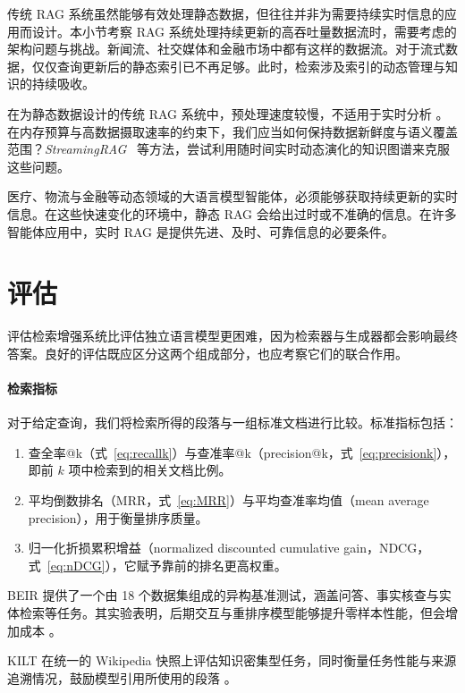 传统 RAG 系统虽然能够有效处理静态数据，但往往并非为需要持续实时信息的应用而设计。本小节考察 RAG 系统处理持续更新的高吞吐量数据流时，需要考虑的架构问题与挑战。新闻流、社交媒体和金融市场中都有这样的数据流。对于流式数据，仅仅查询更新后的静态索引已不再足够。此时，检索涉及索引的动态管理与知识的持续吸收。

在为静态数据设计的传统 RAG 系统中，预处理速度较慢，不适用于实时分析 \citep{zhu2025staticdynamicstreamingrag,sankaradas2025streamingragrealtimecontextualretrieval}。
在内存预算与高数据摄取速率的约束下，我们应当如何保持数据新鲜度与语义覆盖范围？\emph{StreamingRAG}~\citep{sankaradas2025streamingragrealtimecontextualretrieval} 等方法，尝试利用随时间实时动态演化的知识图谱来克服这些问题。

医疗、物流与金融等动态领域的大语言模型智能体，必须能够获取持续更新的实时信息。在这些快速变化的环境中，静态 RAG 会给出过时或不准确的信息。在许多智能体应用中，实时 RAG 是提供先进、及时、可靠信息的必要条件。


\section{评估}\label{sec:r_evaluation}
评估检索增强系统比评估独立语言模型更困难，因为检索器与生成器都会影响最终答案。良好的评估既应区分这两个组成部分，也应考察它们的联合作用。

\paragraph{检索指标} 对于给定查询，我们将检索所得的段落与一组标准文档进行比较。标准指标包括：
\begin{enumerate}
    \item 查全率@k（式~\ref{eq:recallk}）与查准率@k（precision@k，式~\ref{eq:precisionk}），即前 $k$ 项中检索到的相关文档比例。
    \item 平均倒数排名（MRR，式~\ref{eq:MRR}）与平均查准率均值（mean average precision），用于衡量排序质量。
    \item 归一化折损累积增益（normalized discounted cumulative gain，NDCG，式~\ref{eq:nDCG}），它赋予靠前的排名更高权重。
\end{enumerate}
BEIR 提供了一个由 18 个数据集组成的异构基准测试，涵盖问答、事实核查与实体检索等任务。其实验表明，后期交互与重排序模型能够提升零样本性能，但会增加成本 \citep{thakur2021beir}。

KILT 在统一的 Wikipedia 快照上评估知识密集型任务，同时衡量任务性能与来源追溯情况，鼓励模型引用所使用的段落 \citep{petroni2021kilt}。


